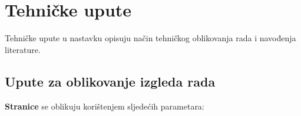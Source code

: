 \lipsum[3-4]

\chapter{Tehničke upute}

Tehničke upute u nastavku opisuju način tehničkog oblikovanja rada i navođenja literature.

\section{Upute za oblikovanje izgleda rada}

\begin{flushleft}\textbf{Stranice} se oblikuju korištenjem sljedećih parametara:\end{flushleft}

